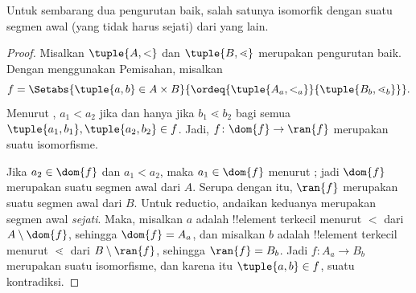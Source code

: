 \documentclass[../../../include/open-logic-section]{subfiles}
\begin{document}
\begin{thm}
Untuk sembarang dua pengurutan baik, salah satunya isomorfik dengan suatu
segmen awal (yang tidak harus sejati) dari yang lain.
\end{thm}

\begin{proof}
Misalkan $\tuple{A, <}$ dan $\tuple{B, \lessdot}$ merupakan pengurutan baik.
Dengan menggunakan Pemisahan, misalkan
\[
	f = \Setabs{\tuple{a, b} \in A \times B}{
		\ordeq{\tuple{A_a, <_a}}{\tuple{B_b, \lessdot_b}}}.
\]
Menurut , $a_1 < a_2$ jika dan hanya jika $b_1
\lessdot b_2$ bagi semua $\tuple{a_1, b_1}, \tuple{a_2, b_2} \in f$. Jadi,
$f \colon \dom{f} \to \ran{f}$ merupakan suatu isomorfisme.

Jika $a_2 \in \dom{f}$ dan $a_1 < a_2$, maka $a_1 \in \dom{f}$ menurut
; jadi $\dom{f}$ merupakan suatu segmen awal
dari $A$. Serupa dengan itu, $\ran{f}$ merupakan suatu segmen awal dari $B$.
Untuk reductio, andaikan keduanya merupakan segmen awal \emph{sejati}. Maka,
misalkan $a$ adalah !!{element} terkecil menurut $<$ dari $A \setminus
\dom{f}$, sehingga $\dom{f} = A_a$, dan misalkan $b$ adalah !!{element}
terkecil menurut $\lessdot$ dari $B \setminus \ran{f}$, sehingga $\ran{f} =
B_b$. Jadi $f \colon A_a \to B_b$ merupakan suatu isomorfisme, dan karena
itu $\tuple{a, b} \in f$, suatu kontradiksi.
\end{proof}
\end{document}
